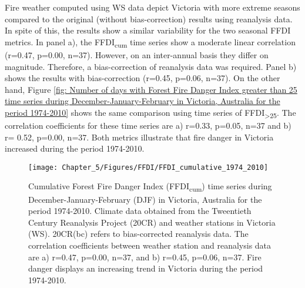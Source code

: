 Fire weather computed using WS data depict Victoria with more extreme
seasons compared to the original (without bias-correction) results
using reanalysis data. In spite of this, the results show a similar
variability for the two seasonal FFDI metrics. In panel a), the FFDI\textsubscript{cum}
time series show a moderate linear correlation (r=0.47, p=0.00, n=37).
However, on an inter-annual basis they differ on magnitude. Therefore,
a bias-correction of reanalysis data was required. Panel b) shows
the results with bias-correction (r=0.45, p=0.06, n=37). On the other
hand, Figure \ref{fig: Number of days with Forest Fire Danger Index greater than 25 time series during December-January-February in Victoria, Australia for the period 1974-2010}
shows the same comparison using time series of FFDI\textsubscript{>25}.
The correlation coefficients for these time series are a) r=0.33,
p=0.05, n=37 and b) r= 0.52, p=0.00, n=37. Both metrics illustrate
that fire danger in Victoria increased during the period 1974-2010.

\begin{figure}[h]
\noindent \begin{centering}
\texttt{[image: Chapter\_5/Figures/FFDI/FFDI\_cumulative\_1974\_2010]}
\par\end{centering}

\caption[Cumulative Forest Fire Danger Index (FFDI\protect\textsubscript{cum})
time series during December-January-February (DJF) in Victoria, Australia
for the period 1974-2010]{Cumulative Forest Fire Danger Index (FFDI\protect\textsubscript{cum})
time series during December-January-February (DJF) in Victoria, Australia
for the period 1974-2010. Climate data obtained from the Tweentieth
Century Reanalysis Project (20CR) and weather stations in Victoria
(WS). 20CR(bc) refers to bias-corrected reanalysis data. The correlation
coefficients between weather station and reanalysis data are a) r=0.47,
p=0.00, n=37, and b) r=0.45, p=0.06, n=37. Fire danger displays an
increasing trend in Victoria during the period 1974-2010. \label{fig: Cumulative Forest Fire Danger Index time series during December-January-February in Victoria, Australia for the period 1974-2010} }
\end{figure}


